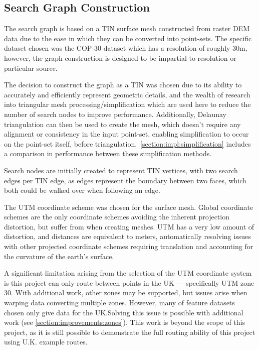 \documentclass[12pt]{article}
\begin{document}
\subsection{Search Graph Construction}

The search graph is based on a TIN surface mesh constructed from raster DEM data due to the ease in which they can be converted into point-sets. The specific dataset chosen was the COP-30 dataset which has a resolution of roughly 30m, however, the graph construction is designed to be impartial to resolution or particular source.

The decision to construct the graph as a TIN was chosen due to its ability to accurately and efficiently represent geometric details, and the wealth of research into triangular mesh processing/simplification which are used here to reduce the number of search nodes to improve performance. Additionally, Delaunay triangulation can then be used to create the mesh, which doesn't require any alignment or consistency in the input point-set, enabling simplification to occur on the point-set itself, before triangulation.\ \autoref{section:impl:simplification} includes a comparison in performance between these simplification methods.

Search nodes are initially created to represent TIN vertices, with two search edges per TIN edge, as edges represent the boundary between two faces, which both could be walked over when following an edge. %

The UTM coordinate scheme was chosen for the surface mesh. Global coordinate schemes are the only coordinate schemes avoiding the inherent projection distortion, but suffer from %
when creating meshes. UTM has a very low amount of distortion, and distances are equivalent to meters, automatically resolving issues with other projected coordinate schemes requiring translation and accounting for the curvature of the earth's surface.

A significant limitation arising from the selection of the UTM coordinate system is this project can only route between points in the UK --- specifically UTM zone 30. With additional work, other zones may be supported, but issues arise when warping data converting multiple zones. However, many of feature datasets chosen only give data for the UK.\@ Solving this issue is possible with additional work (see \autoref{section:improvements:zones}). This work is beyond the scope of this project, as it is still possible to demonstrate the full routing ability of this project using U.K. example routes.
\end{document}
